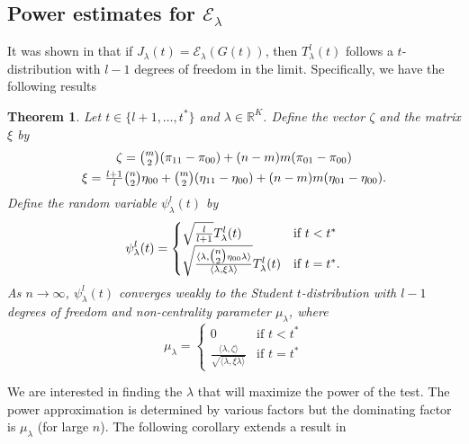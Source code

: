\documentclass[10pt,journal,compsoc]{IEEEtran}
\newtheorem{theorem}{Theorem}
\theoremstyle{definition}
\begin{document}
\subsection{Power estimates for $\mathcal{E}_\lambda$}
\label{sec:power-estim-mathc}
It was shown in \cite{lee11} that if $J_\lambda(t) =
\mathcal{E}_{\lambda}(G(t))$, then $T_{\lambda}^{l}(t)$ follows a
$t$-distribution with $l - 1$ degrees of freedom in the
limit. Specifically, we have the following results
\begin{theorem}
  \label{thm:9}
  Let $t \in \{l+1, \dots, t^{*}\}$ and $\lambda \in
  \mathbb{R}^{K}$. Define the vector $\zeta$ and the matrix $\xi$ by
  \begin{gather*}
    \zeta = \tbinom{m}{2}(\pi_{11} - \pi_{00}) + (n-m)m(\pi_{01} -
    \pi_{00}) \\
    \xi = \tfrac{l+1}{l}\tbinom{n}{2} \eta_{00} +
          \tbinom{m}{2}(\eta_{11} - \eta_{00}) + (n-m)m(\eta_{01} -
          \eta_{00}).
  \end{gather*}
  Define the random variable $\psi^{l}_{\lambda}(t)$ by
  \begin{equation}
    \label{eq:10}
    \psi^{l}_{\lambda}(t) = \begin{cases}
      \sqrt{\frac{l}{l + 1}} T_{\lambda}^{l}(t)& \text{if $t < t^{*}$}
      \\ \sqrt{\frac{\langle \lambda, \tbinom{n}{2} \eta_{00}
            \lambda \rangle}{\langle \lambda, \xi
            \lambda \rangle}} T_{\lambda}^{l}(t) & \text{if $t =
          t^{*}$}.
      \end{cases}
  \end{equation}
As $n \rightarrow \infty$,
  $\psi^{l}_{\lambda}(t)$ converges weakly to the Student
  $t$-distribution with $l-1$ degrees of freedom and non-centrality
  parameter $\mu_{\lambda}$, where
  \begin{equation}
    \label{eq:15}
    \mu_{\lambda} = \begin{cases}
      0 & \text{if $t < t^{*}$} \\
      \frac{\langle \lambda, \zeta \rangle}{\sqrt{\langle \lambda, \xi \lambda \rangle}} & \text{if $t = t^{*}$} 
    \end{cases}
  \end{equation}
\end{theorem}
We are interested in finding the $\lambda$ that will maximize the
power of the test. The power approximation is determined by various
factors but the dominating factor is $\mu_{\lambda}$ (for large $n$). 
The following corollary extends a result in
\end{document}
